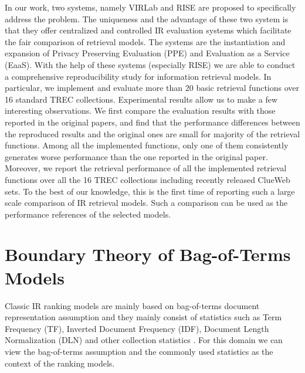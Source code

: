 In our work, two systems, namely VIRLab \cite{Fang:2014:VWV:2600428.2611178} 
and RISE \cite{Yang:2016:RSI:2970398.2970415} are proposed to specifically 
address the problem. The uniqueness and the advantage of these two system is 
that they offer centralized and controlled IR evaluation systems which 
facilitate the fair comparison of retrieval models. The systems are the 
instantiation and expansion of Privacy Preserving Evaluation (PPE)\cite{Fang:2014:VWV:2600428.2611178} 
and Evaluation as a Service (EaaS)\cite{rao:ecir:2015}. 
With the help of these systems (especially RISE) we are able to conduct a 
comprehensive reproducibility study for information retrieval models. 
In particular, we implement and evaluate more than 20 basic retrieval 
functions over 16 standard TREC collections. Experimental results allow us to 
make a few interesting observations. We first compare the evaluation results 
with those reported in the original papers, and find that the performance 
differences between the reproduced results and the original ones are small 
for majority of the retrieval functions. Among all the implemented functions, 
only one of them consistently generates worse performance than the one 
reported in the original paper. Moreover, we report the retrieval 
performance of all the implemented retrieval functions over all the 16 
TREC collections including recently released ClueWeb sets. 
To the best of our knowledge, this is the first time of reporting such a 
large scale comparison of IR retrieval models. Such a comparison can be used 
as the performance references of the selected models.


\section{Boundary Theory of Bag-of-Terms Models}
Classic IR ranking models \cite{Robertson96okapiat3,Singhal:1996:PDL:243199.243206,Zhai:2004:SSM:984321.984322,Amati:2002:PMI:582415.582416,Fang:2005:EAA:1076034.1076116,Lv:2011:LTF:2063576.2063584,He:2005:SDP:1076034.1076114} 
are mainly based on bag-of-terms 
document representation assumption and they mainly consist of statistics 
such as Term Frequency (TF), Inverted Document Frequency (IDF), 
Document Length Normalization (DLN) and other collection statistics \cite{Fang:2004:FSI:1008992.1009004}. 
For this domain we can view the bag-of-terms assumption and the 
commonly used statistics as the context of the ranking models. 


